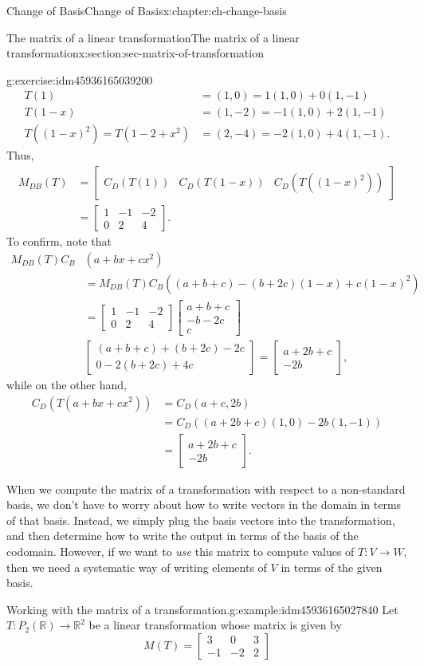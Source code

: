 \documentclass[oneside,10pt,]{book}
\numberwithin{equation}{section}
\newcommand{\bbm}{\begin{bmatrix}}
\newcommand{\ebm}{\end{bmatrix}}
\newcommand{\R}{\mathbb{R}}
\newcommand{\amp}{&}
\begin{document}
\begin{chapterptx}{Change of Basis}{}{Change of Basis}{}{}{x:chapter:ch-change-basis}
\begin{sectionptx}{The matrix of a linear transformation}{}{The matrix of a linear transformation}{}{}{x:section:sec-matrix-of-transformation}
\begin{inlineexercise}{}{g:exercise:idm45936165039200}
\begin{align*}
T(1) \amp = (1,0) = 1(1,0)+0(1,-1) \\
T(1-x) \amp= (1,-2) = -1(1,0)+2(1,-1) \\
T((1-x)^2) = T(1-2+x^2) \amp = (2, -4) = -2(1,0)+4(1,-1)\text{.}
\end{align*}
Thus,%
\begin{align*}
M_{DB}(T) \amp = \bbm C_D(T(1))\amp C_D(T(1-x)) \amp C_D(T((1-x)^2))\ebm\\
\amp = \bbm 1\amp -1\amp -2\\0\amp 2\amp 4\ebm\text{.}
\end{align*}
To confirm, note that%
\begin{align*}
M_{DB}(T)C_B\amp (a+bx+cx^2)\\
\amp = M_{DB}(T)C_B((a+b+c)-(b+2c)(1-x)+c(1-x)^2)\\
\amp = \bbm 1\amp -1\amp -2\\0\amp 2\amp 4\ebm\bbm a+b+c\\ -b-2c\\c\ebm\\
\amp \bbm (a+b+c)+(b+2c)-2c\\0-2(b+2c)+4c\ebm = \bbm a+2b+c\\-2b\ebm\text{,}
\end{align*}
while on the other hand,%
\begin{align*}
C_D(T(a+bx+cx^2)) \amp= C_D(a+c,2b)\\
\amp = C_D((a+2b+c)(1,0)-2b(1,-1))\\
\amp = \bbm a+2b+c\\-2b\ebm\text{.}
\end{align*}
%
\end{inlineexercise}%
When we compute the matrix of a transformation with respect to a non-standard basis, we don't have to worry about how to write vectors in the domain in terms of that basis. Instead, we simply plug the basis vectors into the transformation, and then determine how to write the output in terms of the basis of the codomain. However, if we want to \emph{use} this matrix to compute values of \(T:V\to W\), then we need a systematic way of writing elements of \(V\) in terms of the given basis.%
\begin{example}{Working with the matrix of a transformation.}{g:example:idm45936165027840}%
Let \(T:P_2(\R)\to \R^2\) be a linear transformation whose matrix is given by%
\begin{equation*}
M(T) = \bbm 3\amp 0 \amp 3\\-1\amp -2\amp 2\ebm
\end{equation*}

\end{example}
\end{sectionptx}
\end{chapterptx}
\end{document}
